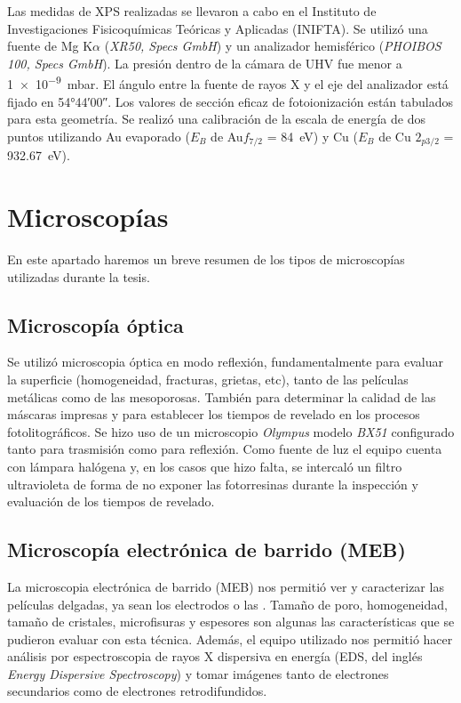 		Las medidas de XPS realizadas se llevaron a cabo en el Instituto de Investigaciones Fisicoquímicas Teóricas y Aplicadas (INIFTA). Se utilizó una fuente de Mg K$\alpha$ (\textit{XR50, Specs GmbH}) y un analizador hemisférico (\textit{PHOIBOS 100, Specs GmbH}). La presión dentro de la cámara de UHV fue menor a \SI{1e-9}{mbar}. El ángulo entre la fuente de rayos X y el eje del analizador está fijado en \ang{54;44;00}. Los valores de sección eficaz de fotoionización están tabulados para esta geometría. Se realizó una calibración de la escala de energía de dos puntos utilizando Au evaporado ($E_B$ de Au$f_{7/2}$ = \SI{84}{\electronvolt}) y Cu ($E_B$ de Cu $2_{p3/2}$ = \SI{932.67}{\electronvolt}).
		
\section{Microscopías}\label{sec:micros}
		
	 En este apartado haremos un breve resumen de los tipos de microscopías utilizadas durante la tesis.

	\subsection{Microscopía óptica}

		Se utilizó microscopia óptica en modo reflexión, fundamentalmente para evaluar la superficie (homogeneidad, fracturas, grietas, etc), tanto de las películas metálicas como de las mesoporosas. También para determinar la calidad de las máscaras impresas y para establecer los tiempos de revelado en los procesos fotolitográficos. Se hizo uso de un microscopio \textit{Olympus} modelo \textit{BX51} configurado tanto para trasmisión como para reflexión. Como fuente de luz el equipo cuenta con lámpara halógena y, en los casos que hizo falta, se intercaló un filtro ultravioleta de forma de no exponer las fotorresinas durante la inspección y evaluación de los tiempos de revelado.
	
	\subsection{Microscopía electrónica de barrido (MEB)}\label{sec:SEM}

		La microscopia electrónica de barrido (MEB) nos permitió ver y caracterizar las películas delgadas, ya sean los electrodos o las \pdm. Tamaño de poro, homogeneidad, tamaño de cristales, microfisuras y espesores son algunas las características que se pudieron evaluar con esta técnica. Además, el equipo utilizado nos permitió hacer análisis por espectroscopia de rayos X dispersiva en energía (EDS, del inglés \textit{Energy Dispersive Spectroscopy}) y tomar imágenes tanto de electrones secundarios como de electrones retrodifundidos. \cite{Goodhew2000,Watt1997}


